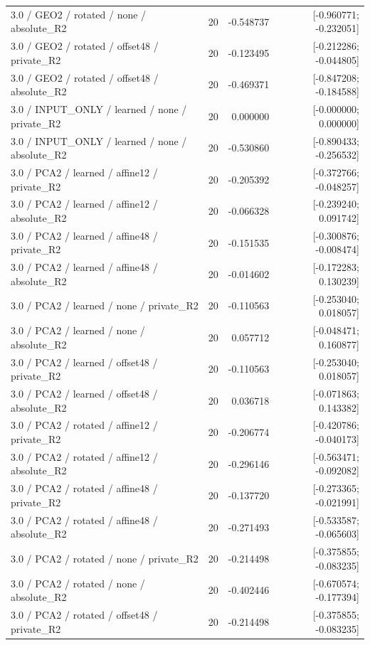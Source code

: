 \begin{longtable}{p{.56\linewidth}rrr}
3.0 / GEO2 / rotated / none / absolute\_R2 & 20 & -0.548737 & [-0.960771; -0.232051] \\
3.0 / GEO2 / rotated / offset48 / private\_R2 & 20 & -0.123495 & [-0.212286; -0.044805] \\
3.0 / GEO2 / rotated / offset48 / absolute\_R2 & 20 & -0.469371 & [-0.847208; -0.184588] \\
3.0 / INPUT\_ONLY / learned / none / private\_R2 & 20 & 0.000000 & [-0.000000; 0.000000] \\
3.0 / INPUT\_ONLY / learned / none / absolute\_R2 & 20 & -0.530860 & [-0.890433; -0.256532] \\
3.0 / PCA2 / learned / affine12 / private\_R2 & 20 & -0.205392 & [-0.372766; -0.048257] \\
3.0 / PCA2 / learned / affine12 / absolute\_R2 & 20 & -0.066328 & [-0.239240; 0.091742] \\
3.0 / PCA2 / learned / affine48 / private\_R2 & 20 & -0.151535 & [-0.300876; -0.008474] \\
3.0 / PCA2 / learned / affine48 / absolute\_R2 & 20 & -0.014602 & [-0.172283; 0.130239] \\
3.0 / PCA2 / learned / none / private\_R2 & 20 & -0.110563 & [-0.253040; 0.018057] \\
3.0 / PCA2 / learned / none / absolute\_R2 & 20 & 0.057712 & [-0.048471; 0.160877] \\
3.0 / PCA2 / learned / offset48 / private\_R2 & 20 & -0.110563 & [-0.253040; 0.018057] \\
3.0 / PCA2 / learned / offset48 / absolute\_R2 & 20 & 0.036718 & [-0.071863; 0.143382] \\
3.0 / PCA2 / rotated / affine12 / private\_R2 & 20 & -0.206774 & [-0.420786; -0.040173] \\
3.0 / PCA2 / rotated / affine12 / absolute\_R2 & 20 & -0.296146 & [-0.563471; -0.092082] \\
3.0 / PCA2 / rotated / affine48 / private\_R2 & 20 & -0.137720 & [-0.273365; -0.021991] \\
3.0 / PCA2 / rotated / affine48 / absolute\_R2 & 20 & -0.271493 & [-0.533587; -0.065603] \\
3.0 / PCA2 / rotated / none / private\_R2 & 20 & -0.214498 & [-0.375855; -0.083235] \\
3.0 / PCA2 / rotated / none / absolute\_R2 & 20 & -0.402446 & [-0.670574; -0.177394] \\
3.0 / PCA2 / rotated / offset48 / private\_R2 & 20 & -0.214498 & [-0.375855; -0.083235] \\

\end{longtable}
